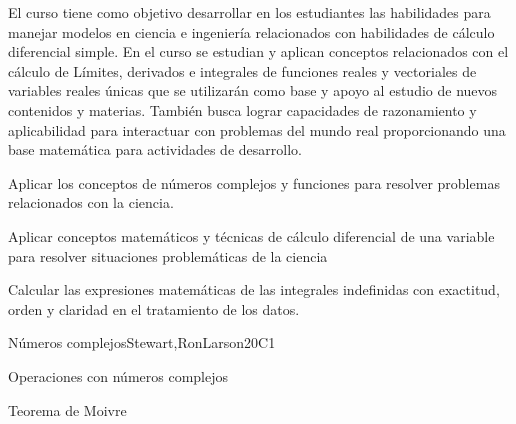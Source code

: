 \begin{syllabus}


\begin{justification}
El curso tiene como objetivo desarrollar en los estudiantes las habilidades para manejar modelos en ciencia e ingeniería relacionados con habilidades de cálculo diferencial simple. En el curso se estudian y aplican conceptos relacionados con el cálculo de Límites, derivados e integrales de funciones reales y vectoriales de variables reales únicas que se utilizarán como base y
apoyo al estudio de nuevos contenidos y materias. También busca lograr capacidades de razonamiento y aplicabilidad para interactuar con problemas del mundo real proporcionando una base matemática para actividades de desarrollo.
\end{justification}

\begin{goals}
\item Aplicar los conceptos de números complejos y funciones para resolver problemas relacionados con la ciencia.
\item Aplicar conceptos matemáticos y técnicas de cálculo diferencial de una variable para resolver situaciones problemáticas de la ciencia
\item Calcular las expresiones matemáticas de las integrales indefinidas con exactitud, orden y claridad en el tratamiento de los datos.
\end{goals}

\begin{outcomes}
    \item {}
    \item {}
\end{outcomes}

\begin{competences}
    \item {}
    \item {}
    \item {}
\end{competences}

\begin{unit}{Números complejos}{}{Stewart,RonLarson}{20}{C1}
   \begin{topics}
    \item Operaciones con números complejos
    \item Teorema de Moivre 
   \end{topics}


\end{unit}
\end{syllabus}
